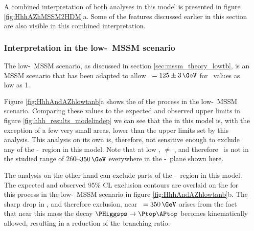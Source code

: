 A combined interpretation of both analyses in this model is presented
in figure \ref{fig:HhhAZhMSSM2HDM}a. Some of the features discussed earlier
in this section are also visible in this combined interpretation.


\subsubsection{Interpretation in the low-\tanb~MSSM scenario}
\label{sec:hhh_results_modeldep_lowtb}
The low-\tanb~MSSM scenario, as discussed in section \ref{sec:mssm_theory_lowtb},
is an \ac{MSSM} scenario that has been adapted to allow \mh~$=125 \pm 3\,\GeV$ for \tanb~values
as low as 1.  

Figure \ref{fig:HhhAndAZhlowtanb}a shows the \xsbr 
of the \Htohhtobbtautau process in the low-\tanb~MSSM scenario. Comparing these values 
to the expected and observed upper limits in figure \ref{fig:hhh_results_modelindep} we 
can see that the \xsbr in this model is, with the exception of a few very small 
areas, lower than the upper limits set by this analysis. This analysis on its own is,
therefore, not sensitive enough to exclude any of the \mA-\tanb~region in this model. Note that
at low \tanb, \mA$\neq$ \mH, and therefore \mH~is not in the studied range of $260$--$350\,\GeV$
everywhere in the \mA-\tanb~plane shown here.

The \AtoZhtolltautau analysis on the other hand can exclude parts of the \mA-\tanb~region
in this model. The expected and observed 95\% \ac{CL} exclusion contours are overlaid 
on the \xsbr for this process in the low-\tanb~MSSM scenario in  
figure \ref{fig:HhhAndAZhlowtanb}b. The sharp drop in \xsbr, and therefore exclusion,
near \mA~$ = 350\,\GeV$ arises from the fact that near this mass the decay $\PHiggsps \rightarrow \Ptop\APtop$ becomes
kinematically allowed, resulting in a reduction of the \AtoZh branching ratio.


